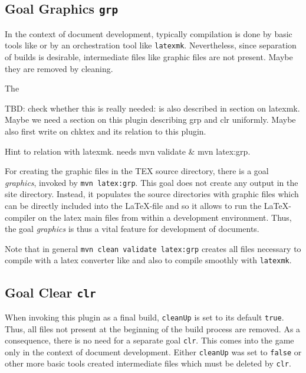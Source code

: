 \subsection{Goal Graphics \texttt{grp}}\label{subsec:develGraph}

In the context of document development, 
typically compilation is done by basic tools like \lualatex{} 
or by an orchestration tool like \texttt{latexmk}. 
Nevertheless, since separation of builds is desirable, 
intermediate files like graphic files are not present. 
Maybe they are removed by cleaning. 

The 

TBD\@: check whether this is really needed: is also described in section on latexmk. 
Maybe we need a section on this plugin describing grp and clr uniformly. 
Maybe also first write on chktex and its relation to this plugin. 

Hint to relation with latexmk. 
needs mvn validate \& mvn latex:grp. 

For creating the graphic files in the TEX source directory, 
there is a goal \emph{graphics}, invoked by \texttt{mvn latex:grp}. 
This goal does not create any output in the site directory. 
Instead, it populates the source directories 
with graphic files which can be directly included into the \LaTeX-file 
and so it allows to run the \LaTeX-compiler on the latex main files 
from within a development environment. 
Thus, the goal \emph{graphics} is thus a vital feature 
for development of documents. 


Note that in general \texttt{mvn clean validate latex:grp} 
creates all files necessary to compile with a latex converter like \lualatex{} 
and also to compile smoothly with \texttt{latexmk}. 



\subsection{Goal Clear \texttt{clr}}\label{subsec:develClear}

When invoking this plugin as a final build, 
\texttt{cleanUp} is set to its default \texttt{true}. 
Thus, all files not present at the beginning of the build process are removed. 
As a consequence, there is no need for a separate goal \texttt{clr}. 
This comes into the game only in the context of document development. 
Either \texttt{cleanUp} was set to \texttt{false} 
or other more basic tools created intermediate files which must be deleted by \texttt{clr}. 

